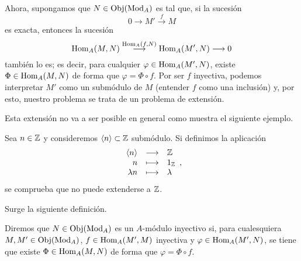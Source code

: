 \documentclass[../main.tex]{subfiles}
\begin{document}
Ahora, supongamos que $N\in\text{Obj}(\text{Mod}_A)$ es tal que, si la sucesión
$$0\longrightarrow M'\overset{f}{\longrightarrow}M$$
es exacta, entonces la sucesión
$$\text{Hom}_A(M,N)\overset{\text{Hom}_A(f,N)}{\longrightarrow}\text{Hom}_A(M',N)\longrightarrow0$$
también lo es; es decir, para cualquier $\varphi\in\text{Hom}_A(M',N)$, existe $\Phi\in\text{Hom}_A(M,N)$ de forma que $\varphi=\Phi\circ f$. Por ser $f$ inyectiva, podemos interpretar $M'$ como un submódulo de $M$ (entender $f$ como una inclusión) y, por esto, nuestro problema se trata de un problema de extensión.

Esta extensión no va a ser posible en general como muestra el siguiente ejemplo.
\begin{example}
    Sea $n\in\mathbb{Z}$ y consideremos $\langle n\rangle\subset\mathbb{Z}$ submódulo. Si definimos la aplicación
    $$\begin{array}{rcl}
        \langle n\rangle&\longrightarrow&\mathbb{Z}\\
        n&\longmapsto&1_{\mathbb{Z}}\\
        \lambda n&\longmapsto&\lambda
    \end{array},$$
    se comprueba que no puede extenderse a $\mathbb{Z}$.
\end{example}

Surge la siguiente definición.

\begin{definition}
    Diremos que $N\in\text{Obj}(\text{Mod}_A)$ es un $A$-módulo inyectivo si, para cualesquiera $M,M'\in\text{Obj}(\text{Mod}_A)$, $f\in\text{Hom}_A(M',M)$ inyectiva y $\varphi\in\text{Hom}_A(M',N)$, se tiene que existe $\Phi\in\text{Hom}_A(M,N)$ de forma que $\varphi=\Phi\circ f$.
\end{definition}
\end{document}
